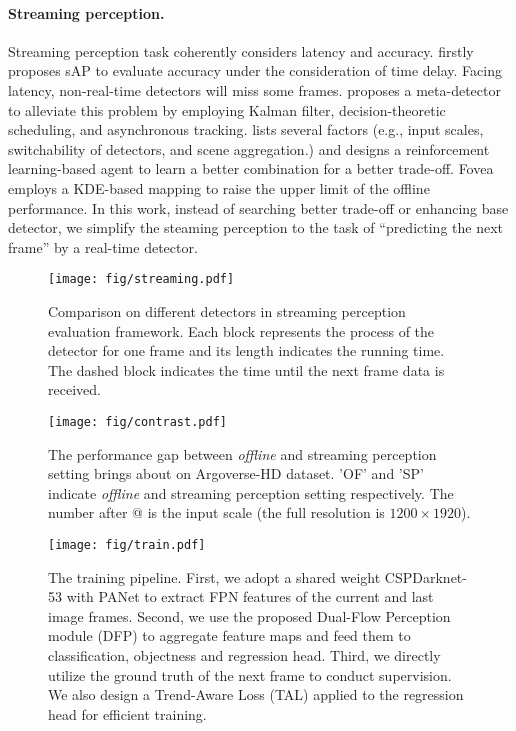 \documentclass[10pt,twocolumn,letterpaper]{article}
\begin{document}
\paragraph{Streaming perception.} Streaming perception task coherently considers latency and accuracy. \cite{streamer} firstly proposes sAP to evaluate accuracy under the consideration of time delay. Facing latency, non-real-time detectors will miss some frames. \cite{streamer} proposes a meta-detector to alleviate this problem by employing Kalman filter\cite{kalman}, decision-theoretic scheduling, and asynchronous tracking\cite{tracker}. \cite{adaptivestreamer} lists several factors (e.g., input scales, switchability of detectors, and scene aggregation.) and designs a reinforcement learning-based agent to learn a better combination for a better trade-off. Fovea\cite{fovea} employs a KDE-based mapping to raise the upper limit of the offline performance. In this work, instead of searching better trade-off or enhancing base detector, we simplify the steaming perception to the task of ``predicting the next frame'' by a real-time detector. 





\begin{figure}[t]
\begin{center}
\texttt{[image: fig/streaming.pdf]}
\caption{Comparison on different detectors in streaming perception evaluation framework. Each block represents the process of the detector for one frame and its length indicates the running time. The dashed block indicates the time until the next frame data is received.}
\label{fig:streaming}
\end{center}
\end{figure}

\begin{figure}[b]
\begin{center}
\texttt{[image: fig/contrast.pdf]}
\caption{The performance gap between \emph{offline} and streaming perception setting brings about on Argoverse-HD dataset. 'OF' and 'SP' indicate \emph{offline} and streaming perception setting respectively. The number after @ is the input scale (the full resolution is $1200 \times 1920$).}
\label{fig:contrast}
\end{center}
\end{figure}

\begin{figure*}
\setlength{\abovecaptionskip}{-3pt}
\begin{center}
\texttt{[image: fig/train.pdf]}
\end{center}
\caption{The training pipeline. First, we adopt a shared weight CSPDarknet-53 with PANet to extract FPN features of the current and last image frames. Second, we use the proposed Dual-Flow Perception module (DFP) to aggregate feature maps and feed them to classification, objectness and regression head. Third, we directly utilize the ground truth of the next frame to conduct supervision. We also design a Trend-Aware Loss (TAL) applied to the regression head for efficient training.}
\label{fig:train}
\end{figure*}
\end{document}
